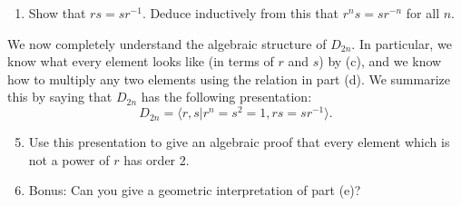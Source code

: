 \documentclass[11pt]{article}
\newcommand{\la}{\langle}
\newcommand{\ra}{\rangle}
\begin{document}
\begin{enumerate}
\begin{enumerate}
{     }
     \item{
     Show that $rs = sr^{-1}$.  Deduce inductively from this that $r^ns = sr^{-n}$ for all $n$.
     }
   \end{enumerate}
   We now completely understand the algebraic structure of $D_{2n}$.  In particular, we know what every element looks like (in terms of $r$ and $s$) by (c), and we know how to multiply any two elements using the relation in part (d).  We summarize this by saying that $D_{2n}$ has the following presentation:
   \[D_{2n} = \la r,s | r^n = s^2 = 1, rs = sr^{-1}\ra.\]
   \begin{enumerate}
     \setcounter{enumii}{4}
     \item{
     Use this presentation to give an algebraic proof that every element which is not a power of $r$ has order 2.
     }
     \item{
     Bonus: Can you give a geometric interpretation of part (e)?
     }
   \end{enumerate}
 \end{enumerate}
\end{document}
